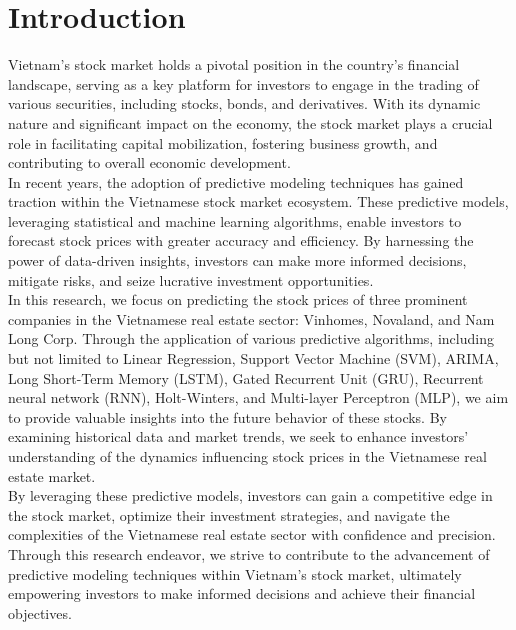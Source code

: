 \documentclass{ieeeojies}
\begin{document}
	\section{Introduction}
	Vietnam's stock market holds a pivotal position in the country's financial landscape, serving as a key platform for investors to engage in the trading of various securities, including stocks, bonds, and derivatives. With its dynamic nature and significant impact on the economy, the stock market plays a crucial role in facilitating capital mobilization, fostering business growth, and contributing to overall economic development.\\
	In recent years, the adoption of predictive modeling techniques has gained traction within the Vietnamese stock market ecosystem. These predictive models, leveraging statistical and machine learning algorithms, enable investors to forecast stock prices with greater accuracy and efficiency. By harnessing the power of data-driven insights, investors can make more informed decisions, mitigate risks, and seize lucrative investment opportunities.\\
	In this research, we focus on predicting the stock prices of three prominent companies in the Vietnamese real estate sector: Vinhomes, Novaland, and Nam Long Corp. Through the application of various predictive algorithms, including but not limited to Linear Regression, Support Vector Machine (SVM), ARIMA, Long Short-Term Memory (LSTM), Gated Recurrent Unit (GRU), Recurrent neural network (RNN), Holt-Winters, and Multi-layer Perceptron (MLP), we aim to provide valuable insights into the future behavior of these stocks. By examining historical data and market trends, we seek to enhance investors' understanding of the dynamics influencing stock prices in the Vietnamese real estate market.\\
	By leveraging these predictive models, investors can gain a competitive edge in the stock market, optimize their investment strategies, and navigate the complexities of the Vietnamese real estate sector with confidence and precision. Through this research endeavor, we strive to contribute to the advancement of predictive modeling techniques within Vietnam's stock market, ultimately empowering investors to make informed decisions and achieve their financial objectives. 
	
\end{document}
